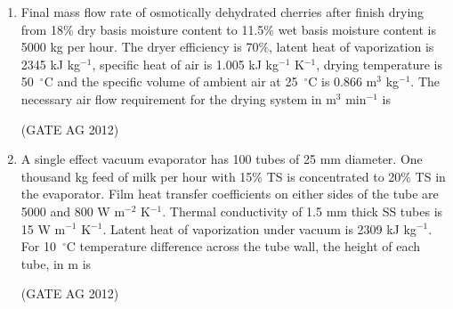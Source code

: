 \documentclass[journal]{IEEEtran}
\begin{document}
\begin{enumerate}
\medskip

\item
 Final mass flow rate of osmotically dehydrated cherries after finish drying from 18\% dry basis moisture content to 11.5\% wet basis moisture content is 5000 kg per hour. The dryer efficiency is 70\%, latent heat of vaporization is 2345 kJ kg$^{-1}$, specific heat of air is 1.005 kJ kg$^{-1}$ K$^{-1}$, drying temperature is 50~$^\circ$C and the specific volume of ambient air at 25~$^\circ$C is 0.866 m$^3$ kg$^{-1}$. The necessary air flow requirement for the drying system in m$^3$ min$^{-1}$ is
\begin{enumerate}
\end{enumerate}
\hfill(GATE AG 2012)\\

\medskip

\item
 A single effect vacuum evaporator has 100 tubes of 25 mm diameter. One thousand kg feed of milk per hour with 15\% TS is concentrated to 20\% TS in the evaporator. Film heat transfer coefficients on either sides of the tube are 5000 and 800 W m$^{-2}$ K$^{-1}$. Thermal conductivity of 1.5 mm thick SS tubes is 15 W m$^{-1}$ K$^{-1}$. Latent heat of vaporization under vacuum is 2309 kJ kg$^{-1}$. For 10~$^\circ$C temperature difference across the tube wall, the height of each tube, in m is
\begin{enumerate}
\end{enumerate}
\hfill(GATE AG 2012)\\

\medskip


\end{enumerate}
\end{document}
